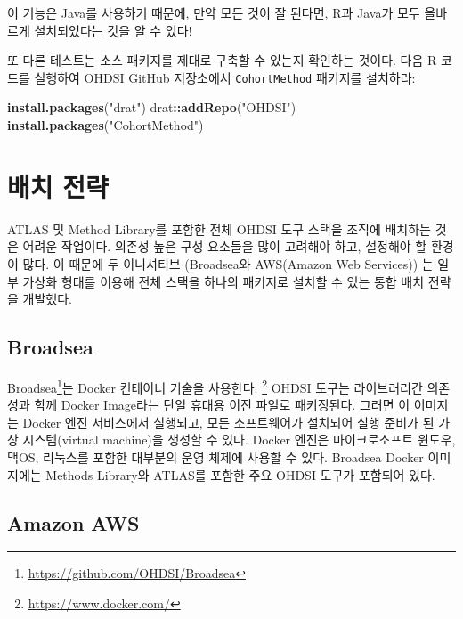 \documentclass[11pt]{book}
\newenvironment{Shaded}{\begin{snugshade}}{\end{snugshade}}
\newcommand{\KeywordTok}[1]{\textcolor[rgb]{0.13,0.29,0.53}{\textbf{#1}}}
\newcommand{\StringTok}[1]{\textcolor[rgb]{0.31,0.60,0.02}{#1}}
\newcommand{\OperatorTok}[1]{\textcolor[rgb]{0.81,0.36,0.00}{\textbf{#1}}}
\newcommand{\NormalTok}[1]{#1}
\let\rmarkdownfootnote\footnote%
\def\footnote{\protect\rmarkdownfootnote}
\theoremstyle{definition}
\theoremstyle{definition}
\theoremstyle{definition}
\theoremstyle{remark}
\begin{document}
이 기능은 Java를 사용하기 때문에, 만약 모든 것이 잘 된다면, R과 Java가
모두 올바르게 설치되었다는 것을 알 수 있다!

또 다른 테스트는 소스 패키지를 제대로 구축할 수 있는지 확인하는 것이다.
다음 R 코드를 실행하여 OHDSI GitHub 저장소에서 \texttt{CohortMethod}
패키지를 설치하라:

\begin{Shaded}
\begin{Highlighting}[]
\KeywordTok{install.packages}\NormalTok{(}\StringTok{"drat"}\NormalTok{)}
\NormalTok{drat}\OperatorTok{::}\KeywordTok{addRepo}\NormalTok{(}\StringTok{"OHDSI"}\NormalTok{)}
\KeywordTok{install.packages}\NormalTok{(}\StringTok{"CohortMethod"}\NormalTok{)}
\end{Highlighting}
\end{Shaded}

\section{배치 전략}\label{-}

ATLAS 및 Method Library를 포함한 전체 OHDSI 도구 스택을 조직에 배치하는
것은 어려운 작업이다. 의존성 높은 구성 요소들을 많이 고려해야 하고,
설정해야 할 환경이 많다. 이 때문에 두 이니셔티브 (Broadsea와 AWS(Amazon
Web Services)) 는 일부 가상화 형태를 이용해 전체 스택을 하나의 패키지로
설치할 수 있는 통합 배치 전략을 개발했다. 

\subsection{Broadsea}\label{broadsea}

Broadsea\footnote{\url{https://github.com/OHDSI/Broadsea}}는 Docker
컨테이너 기술을 사용한다. \footnote{\url{https://www.docker.com/}} OHDSI
도구는 라이브러리간 의존성과 함께 Docker Image라는 단일 휴대용 이진
파일로 패키징된다. 그러면 이 이미지는 Docker 엔진 서비스에서 실행되고,
모든 소프트웨어가 설치되어 실행 준비가 된 가상 시스템(virtual machine)을
생성할 수 있다. Docker 엔진은 마이크로소프트 윈도우, 맥OS, 리눅스를
포함한 대부분의 운영 체제에 사용할 수 있다. Broadsea Docker 이미지에는
Methods Library와 ATLAS를 포함한 주요 OHDSI 도구가 포함되어 있다.

\subsection{Amazon AWS}\label{amazon-aws}
\end{document}
